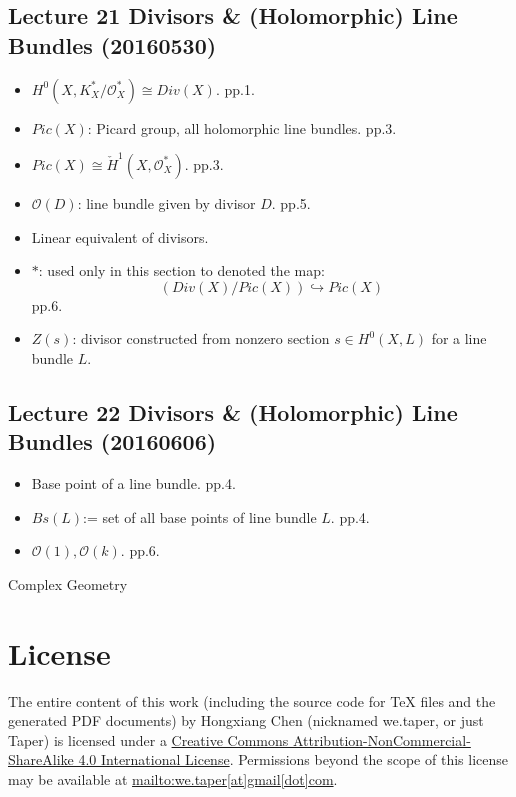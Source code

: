 \documentclass{article}
\numberwithin{equation}{subsection} %
\begin{document}
	\subsection{Lecture 21 Divisors \& (Holomorphic) Line Bundles  (20160530)}
	\begin{itemize}
		\item $H^0(X,K^*_X/\mathcal{O}^*_X) \cong Div(X)$. pp.1.
		\item $Pic(X)$: Picard group, all holomorphic line bundles. pp.3.
		\item $Pic(X) \cong \check{H}^1(X,\mathcal{O}^*_X)$. pp.3.
		\item $\mathcal{O}(D)$: line bundle given by divisor $D$. pp.5.
		\item Linear equivalent of divisors.
		\item $*$: used only in this section to denoted the map:
		$$\left( Div(X)/Pic(X) \right) \hookrightarrow Pic(X)$$
		pp.6.
		\item $Z(s)$: divisor constructed from nonzero section $s\in H^0(X,L)$ for a line bundle $L$.
	\end{itemize}
	
	\subsection{Lecture 22 Divisors \& (Holomorphic) Line Bundles (20160606)}
	\begin{itemize}
		\item Base point of a line bundle. pp.4.
		\item $Bs(L)$:= set of all base points of line bundle $L$. pp.4.
		\item $\mathcal{O}(1), \mathcal{O}(k)$. pp.6.
	\end{itemize}

\begin{thebibliography}{1}
	
	
	 Complex Geometry
	
	
\end{thebibliography}
\section{License}
The entire content of this work (including the source code
for TeX files and the generated PDF documents) by 
Hongxiang Chen (nicknamed we.taper, or just Taper) is
licensed under a 
\href{http://creativecommons.org/licenses/by-nc-sa/4.0/}{Creative 
Commons Attribution-NonCommercial-ShareAlike 4.0 International 
License}. Permissions beyond the scope of this 
license may be available at \url{mailto:we.taper[at]gmail[dot]com}.
\end{document}
